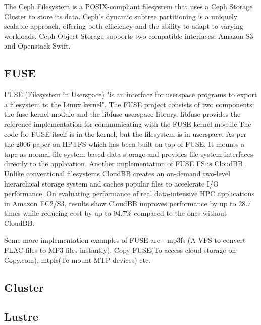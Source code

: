      The Ceph Filesystem \cite{www-cephfs} is a POSIX-compliant
     filesystem that uses a Ceph Storage Cluster to store its
     data. Ceph’s dynamic subtree partitioning is a uniquely scalable
     approach, offering both efficiency and the ability to adapt to
     varying workloads. Ceph Object Storage supports two compatible
     interfaces: Amazon S3 and Openstack Swift.

\subsection{ FUSE}

     FUSE (Filesystem in Userspace) \cite{www-fuse} "is an interface
     for userspace programs to export a filesystem to the Linux
     kernel". The FUSE project consists of two components: the fuse
     kernel module and the libfuse userspace library. libfuse provides
     the reference implementation for communicating with the FUSE
     kernel module.The code for FUSE itself is in the kernel, but the
     filesystem is in userspace.  As per the 2006 paper
     \cite{fuse-paper-hptfs} on HPTFS which has been built on top of
     FUSE. It mounts a tape as normal file system based data storage
     and provides file system interfaces directly to the application.
     Another implementation of FUSE FS is CloudBB
     \cite{fuse-paper-CloudBB}. Unlike conventional filesystems
     CloudBB creates an on-demand two-level hierarchical storage
     system and caches popular files to accelerate I/O performance. On
     evaluating performance of real data-intensive HPC applications in
     Amazon EC2/S3, results show CloudBB improves performance by up to
     28.7 times while reducing cost by up to 94.7\% compared to the
     ones without CloudBB.

     Some more implementation examples of FUSE are - mp3fs (A VFS to
     convert FLAC files to MP3 files instantly), Copy-FUSE(To access
     cloud storage on Copy.com), mtpfs(To mount MTP devices) etc.

\subsection{ Gluster}
\subsection{ Lustre}

